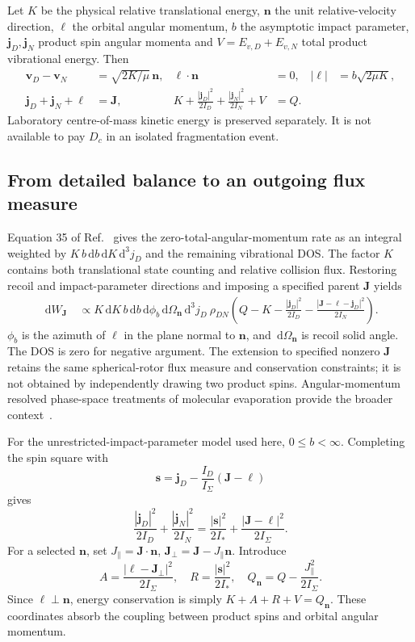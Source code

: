 \documentclass[10pt,a4paper]{article}
\newcommand{\dd}{\,\mathrm d}
\begin{document}
Let $K$ be the physical relative translational energy, $\mathbf n$ the unit
relative-velocity direction, $\boldsymbol\ell$ the orbital angular momentum,
$b$ the asymptotic impact parameter, $\mathbf j_D,\mathbf j_N$ product spin
angular momenta and $V=E_{v,D}+E_{v,N}$ total product vibrational energy. Then
\begin{align}
 \mathbf v_D-\mathbf v_N&=\sqrt{2K/\mu}\,\mathbf n,&
 \boldsymbol\ell\cdot\mathbf n&=0,&
 |\boldsymbol\ell|&=b\sqrt{2\mu K},\label{eq:orbital}\\
 \mathbf j_D+\mathbf j_N+\boldsymbol\ell&=\mathbf J,&
 K+\frac{|\mathbf j_D|^2}{2I_D}
 +\frac{|\mathbf j_N|^2}{2I_N}+V&=Q.&&\label{eq:conservation}
\end{align}
Laboratory centre-of-mass kinetic energy is preserved separately. It is not
available to pay $D_c$ in an isolated fragmentation event.

\subsection{From detailed balance to an outgoing flux measure}
Equation 35 of Ref.~\cite{zapadinsky} gives the zero-total-angular-momentum
rate as an integral weighted by $K\,b\dd b\dd K\dd^3j_D$ and the remaining
vibrational DOS. The factor $K$ contains both translational state counting and
relative collision flux. Restoring recoil and impact-parameter directions and
imposing a specified parent $\mathbf J$ yields
\begin{align}
 \dd W_{\mathbf J}\ &\propto K\dd K\,b\dd b\dd\phi_b\dd\Omega_{\mathbf n}
 \dd^3j_D\ \rho_{DN}\!\left(Q-K-
 \frac{|\mathbf j_D|^2}{2I_D}
 -\frac{|\mathbf J-\boldsymbol\ell-\mathbf j_D|^2}{2I_N}\right).
 \label{eq:flux}
\end{align}
$\phi_b$ is the azimuth of $\boldsymbol\ell$ in the plane normal to
$\mathbf n$, and $\dd\Omega_{\mathbf n}$ is recoil solid angle. The DOS is
zero for negative argument. The extension to specified nonzero $\mathbf J$
retains the same spherical-rotor flux measure and conservation constraints;
it is not obtained by independently drawing two product spins. Angular-momentum
resolved phase-space treatments of molecular evaporation provide the broader
context~\cite{calvo}.

For the unrestricted-impact-parameter model used here, $0\leq b<\infty$.
Completing the spin square with
\[
 \mathbf s=\mathbf j_D-\frac{I_D}{I_\Sigma}
 (\mathbf J-\boldsymbol\ell)
\]
gives
\begin{equation}
 \frac{|\mathbf j_D|^2}{2I_D}+\frac{|\mathbf j_N|^2}{2I_N}
 =\frac{|\mathbf s|^2}{2I_*}
 +\frac{|\mathbf J-\boldsymbol\ell|^2}{2I_\Sigma}.
 \label{eq:square}
\end{equation}
For a selected $\mathbf n$, set $J_\parallel=\mathbf J\cdot\mathbf n$,
$\mathbf J_\perp=\mathbf J-J_\parallel\mathbf n$. Introduce
\[
 A=\frac{|\boldsymbol\ell-\mathbf J_\perp|^2}{2I_\Sigma},\quad
 R=\frac{|\mathbf s|^2}{2I_*},\quad
 Q_{\mathbf n}=Q-\frac{J_\parallel^2}{2I_\Sigma}.
\]
Since $\boldsymbol\ell\perp\mathbf n$, energy conservation is simply
$K+A+R+V=Q_{\mathbf n}$. These coordinates absorb the coupling between
product spins and orbital angular momentum.
\end{document}
